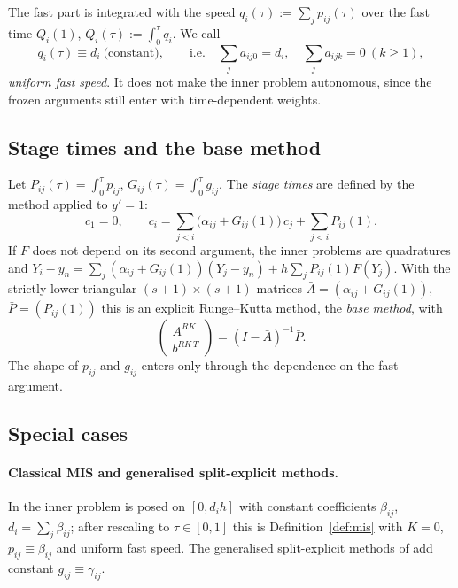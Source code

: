 \documentclass[11pt,a4paper]{article}
\theoremstyle{definition}
\theoremstyle{remark}
\begin{document}
The fast part is integrated with the speed $q_i(\tau):=\sum_jp_{ij}(\tau)$ over the fast time
$Q_i(1)$, $Q_i(\tau):=\int_0^\tau q_i$. We call
\begin{equation}\label{eq:uniform}
 q_i(\tau)\equiv d_i\ \text{(constant)},\qquad\text{i.e.}\quad \sum_j a_{ij0}=d_i,\quad \sum_ja_{ijk}=0\ (k\ge1),
\end{equation}
\emph{uniform fast speed}. It does not make the inner problem autonomous, since the frozen arguments still enter with
time-dependent weights.

\subsection{Stage times and the base method}

Let $P_{ij}(\tau)=\int_0^\tau p_{ij}$, $G_{ij}(\tau)=\int_0^\tau g_{ij}$. The \emph{stage times} are defined by the method
applied to $y'=1$:
\begin{equation}\label{eq:ci}
 c_1=0,\qquad c_i=\sum_{j<i}\big(\alpha_{ij}+G_{ij}(1)\big)\,c_j+\sum_{j<i}P_{ij}(1).
\end{equation}
If $F$ does not depend on its second argument, the inner problems are quadratures and
$Y_i-y_n=\sum_j(\alpha_{ij}+G_{ij}(1))(Y_j-y_n)+h\sum_jP_{ij}(1)F(Y_j)$. With the strictly lower triangular
$(s+1)\times(s+1)$ matrices $\bar A=(\alpha_{ij}+G_{ij}(1))$, $\bar P=(P_{ij}(1))$ this is an explicit Runge--Kutta
method, the \emph{base method}, with
\begin{equation}\label{eq:base}
 \begin{pmatrix}A^{RK}\\ b^{RK\,T}\end{pmatrix}=(I-\bar A)^{-1}\bar P .
\end{equation}
The shape of $p_{ij}$ and $g_{ij}$ enters only through the dependence on the fast argument.

\subsection{Special cases}
\label{sec:specialcases}

\paragraph{Classical MIS and generalised split-explicit methods.}
In \cite{WenschKnothGalant2009} the inner problem is posed on $[0,d_ih]$ with constant coefficients $\beta_{ij}$,
$d_i=\sum_j\beta_{ij}$; after rescaling to $\tau\in[0,1]$ this is Definition~\ref{def:mis} with $K=0$,
$p_{ij}\equiv\beta_{ij}$ and uniform fast speed. The generalised split-explicit methods of \cite{KnothWensch2014} add
constant $g_{ij}\equiv\gamma_{ij}$.
\end{document}
